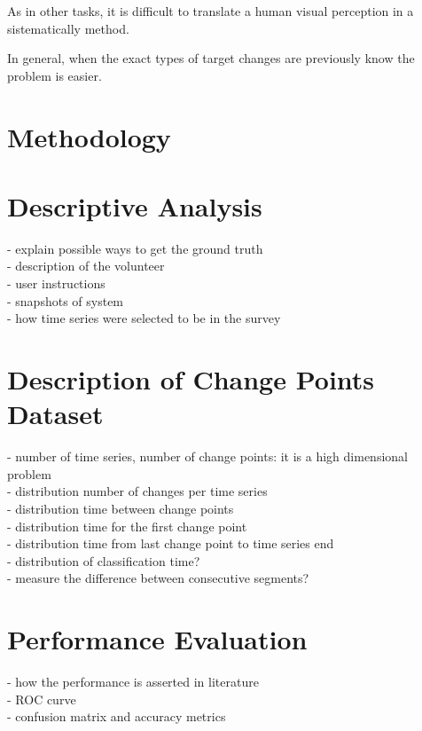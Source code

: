 As in other tasks, it is difficult to translate a human visual perception in a sistematically method.

In general, when the exact types of target changes are previously know the problem is easier.

\section{Methodology}

\section{Descriptive Analysis}

- explain possible ways to get the ground truth\\
- description of the volunteer\\
- user instructions\\
- snapshots of system\\ 
- how time series were selected to be in the survey\\

\section{Description of Change Points Dataset}

- number of time series, number of change points: it is a high dimensional problem\\
- distribution number of changes per time series\\
- distribution time between change points\\
- distribution time for the first change point\\
- distribution time from last change point to time series end\\
- distribution of classification time?\\
- measure the difference between consecutive segments?\\

\section{Performance Evaluation}

- how the performance is asserted in literature\\
- ROC curve\\
- confusion matrix and accuracy metrics\\
